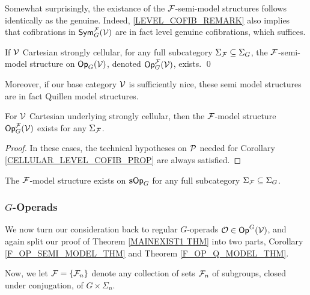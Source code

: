 \documentclass[a4paper,10pt]{article}%
\begin{document}
Somewhat surprisingly, the existance of the $\F$-semi-model structures follows identically as the genuine. Indeed, \ref{LEVEL_COFIB_REMARK} also implies that cofibrations in $\Sym_G^\F(\V)$ are in fact level genuine cofibrations, which suffices.
\begin{corollary} 
  \label{OP_F_SEMI_MODEL_THM}
  If $\V$ Cartesian strongly cellular, for any full subcategory $\Sigma_\F \subseteq \Sigma_G$, the $\F$-semi-model structure on $\Op_G(\V)$, denoted $\Op_G^{\mathcal F}(\V)$, exists.  \qed
\end{corollary} 

Moreover, if our base category $\V$ is sufficiently nice, these semi model structures are in fact Quillen model structures. 
\begin{theorem} 
  \label{OP_F_Q_MODEL_THM}
  For $\V$ Cartesian underlying strongly cellular, %
  then the $\F$-model structure $\Op_G^\F(\V)$ exists for any $\Sigma_\F$.
\end{theorem} 
\begin{proof} 
  In these cases, the technical hypotheses on $\P$ needed for Corollary \ref{CELLULAR_LEVEL_COFIB_PROP} are always satisfied. 
\end{proof} 

\begin{example} 
  The $\F$-model structure exists on $\s\Op_G$ for any full subcategory $\Sigma_\F \subseteq \Sigma_G$. 
\end{example} 


\subsubsection{$G$-Operads}
\label{G_OP_EXISTS_SECTION}

We now turn our consideration back to regular $G$-operads $\O \in \Op^G(\V)$, and again split our proof of Theorem \ref{MAINEXIST1 THM} into two parts, Corollary \ref{F_OP_SEMI_MODEL_THM} and Theorem \ref{F_OP_Q_MODEL_THM}.

Now, we let $\F = \set{\F_n}$ denote any collection of sets $\F_n$ of subgroups, closed under conjugation, of $G\times \Sigma_n$.
\end{document}
